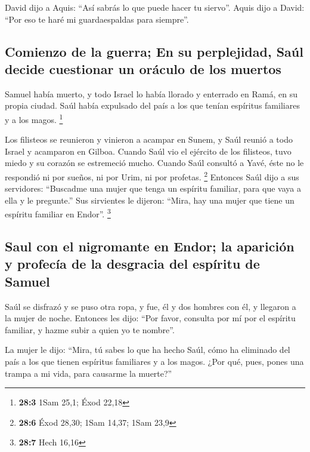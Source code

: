 \begin{paracol}{2}
 David dijo a Aquis: ``Así sabrás lo que puede hacer tu
siervo''. Aquis dijo a David: ``Por eso te haré mi guardaespaldas para
siempre''.

\hypertarget{comienzo-de-la-guerra-en-su-perplejidad-sauxfal-decide-cuestionar-un-oruxe1culo-de-los-muertos}{%
\subsection{Comienzo de la guerra; En su perplejidad, Saúl decide
cuestionar un oráculo de los
muertos}\label{comienzo-de-la-guerra-en-su-perplejidad-sauxfal-decide-cuestionar-un-oruxe1culo-de-los-muertos}}

 Samuel había muerto, y todo Israel lo había llorado y
enterrado en Ramá, en su propia ciudad. Saúl había expulsado del país a
los que tenían espíritus familiares y a los magos. \footnote{\textbf{28:3}
  1Sam 25,1; Éxod 22,18}

 Los filisteos se reunieron y vinieron a acampar en Sunem,
y Saúl reunió a todo Israel y acamparon en Gilboa.  Cuando
Saúl vio el ejército de los filisteos, tuvo miedo y su corazón se
estremeció mucho.  Cuando Saúl consultó a Yavé, éste no le
respondió ni por sueños, ni por Urim, ni por profetas. \footnote{\textbf{28:6}
  Éxod 28,30; 1Sam 14,37; 1Sam 23,9}  Entonces Saúl dijo a
sus servidores: ``Buscadme una mujer que tenga un espíritu familiar,
para que vaya a ella y le pregunte.'' Sus sirvientes le dijeron: ``Mira,
hay una mujer que tiene un espíritu familiar en Endor''. \footnote{\textbf{28:7}
  Hech 16,16}

\hypertarget{saul-con-el-nigromante-en-endor-la-apariciuxf3n-y-profecuxeda-de-la-desgracia-del-espuxedritu-de-samuel}{%
\subsection{Saul con el nigromante en Endor; la aparición y profecía de
la desgracia del espíritu de
Samuel}\label{saul-con-el-nigromante-en-endor-la-apariciuxf3n-y-profecuxeda-de-la-desgracia-del-espuxedritu-de-samuel}}

 Saúl se disfrazó y se puso otra ropa, y fue, él y dos
hombres con él, y llegaron a la mujer de noche. Entonces les dijo: ``Por
favor, consulta por mí por el espíritu familiar, y hazme subir a quien
yo te nombre''.

 La mujer le dijo: ``Mira, tú sabes lo que ha hecho Saúl,
cómo ha eliminado del país a los que tienen espíritus familiares y a los
magos. ¿Por qué, pues, pones una trampa a mi vida, para causarme la
muerte?''


\end{paracol}
